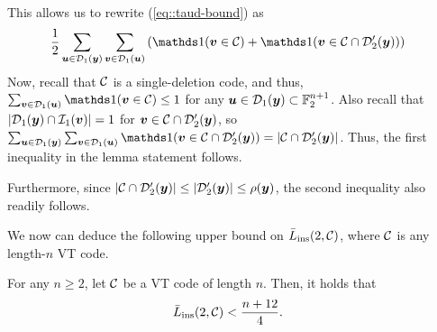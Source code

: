 \documentclass[conference, a4paper]{IEEEtran}
\begin{document}
\begin{IEEEproof}
    This allows us to rewrite (\ref{eq::taud-bound}) as
    \begin{align*}
        &\frac{1}{2}\sum_{\bfu \in \balldel{\bfy}{1}} \sum_{\bfv \in \balldel{\bfu}{1}} \left( \indicator(\bfv \in \cC ) + \indicator(\bfv \in \cC \cap \balldelp{\bfy}{2})\right)
    \end{align*}
    Now, recall that $\mathcal{C}$ is a single-deletion code, and thus, $\sum_{\bfv \in \balldel{\bfu}{1}} \indicator(\bfv \in \cC) \leq 1$ for any ${\boldsymbol u} \in \mathcal{D}_{1}({\boldsymbol y}) \subset \mathbb{F}_2^{n+1}$. Also recall that 
    $|\mathcal{D}_{1}({\boldsymbol y}) \cap \mathcal{I}_{1}({\boldsymbol v})| = 1$ for ${\boldsymbol v} \in \mathcal{C} \cap \mathcal{D}'_{2}({\boldsymbol y})$, so 
    $\sum_{\bfu \in \balldel{\bfy}{1}} \sum_{\bfv \in \balldel{\bfu}{1}} \indicator(\bfv \in \cC \cap \balldelp{\bfy}{2}) = |\cC \cap \balldelp{\bfy}{2}|$. Thus, the first inequality in the lemma statement follows. 
     
     Furthermore, since $|\mathcal{C} \cap \mathcal{D}'_{2}({\boldsymbol y})| \leq |\mathcal{D}'_{2}({\boldsymbol y})| \leq \rho({\boldsymbol y})$, the second inequality also readily follows.
\end{IEEEproof}

We now can deduce the following upper bound on $\bar{L}_\mathrm{ins}(2,\mathcal{C})$, where $\mathcal{C}$ is any length-$n$ VT code.
\begin{theorem} \label{th::upper-bound-2-ins}
    For any $n \geq 2$, let $\mathcal{C}$ be a VT code of length $n$. Then, it holds that 
    \begin{align*}
        \listins{2}{\cC} &< \frac{n+12}{4}.%
    \end{align*}
\end{theorem}
\end{document}
